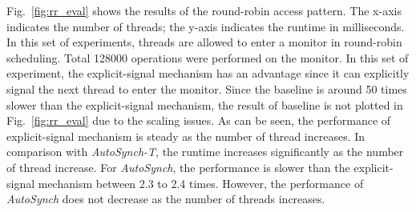 \documentclass[preprint]{sigplanconf}
\begin{document}

%


%
Fig.~\ref{fig:rr_eval} shows the results of the round-robin access pattern. The
x-axis indicates the number of threads; the y-axis indicates the
runtime in milliseconds. In this set of experiments, threads are allowed to enter a
monitor in round-robin scheduling. Total 128000 operations were performed on 
the monitor. In this set of experiment, the explicit-signal mechanism has an 
advantage since it can explicitly signal the next thread to enter the 
monitor. Since the baseline is around 50 times slower than the explicit-signal
mechanism, the result of baseline is not plotted in Fig.~\ref{fig:rr_eval} due
to the scaling issues. 
As can be seen, the performance of explicit-signal mechanism is steady 
as the number of thread increases. In comparison with {\em AutoSynch-T}, the runtime 
increases significantly as the number of thread increase. For {\em AutoSynch}, the 
performance is slower than the explicit-signal mechanism between 2.3 to 2.4
times. However, the performance of {\em AutoSynch} does not decrease as the number of
threads increases. 
\end{document}
